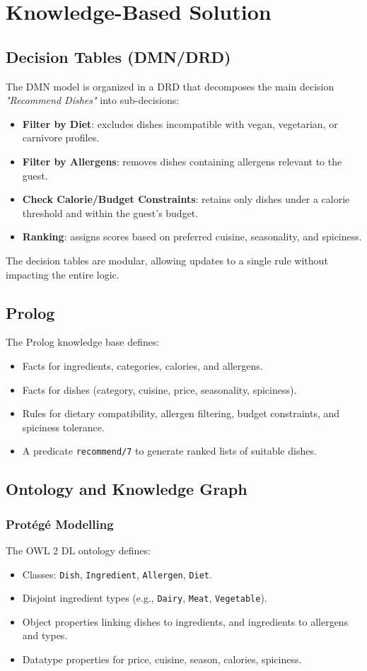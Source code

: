 \documentclass[a4paper,12pt]{article}
\begin{document}
\section{Knowledge-Based Solution}
\subsection{Decision Tables (DMN/DRD)}
The DMN model is organized in a DRD that decomposes the main decision \textit{"Recommend Dishes"} into sub-decisions:
\begin{itemize}
    \item \textbf{Filter by Diet}: excludes dishes incompatible with vegan, vegetarian, or carnivore profiles.
    \item \textbf{Filter by Allergens}: removes dishes containing allergens relevant to the guest.
    \item \textbf{Check Calorie/Budget Constraints}: retains only dishes under a calorie threshold and within the guest's budget.
    \item \textbf{Ranking}: assigns scores based on preferred cuisine, seasonality, and spiciness.
\end{itemize}
The decision tables are modular, allowing updates to a single rule without impacting the entire logic.

\subsection{Prolog}
The Prolog knowledge base defines:
\begin{itemize}
    \item Facts for ingredients, categories, calories, and allergens.
    \item Facts for dishes (category, cuisine, price, seasonality, spiciness).
    \item Rules for dietary compatibility, allergen filtering, budget constraints, and spiciness tolerance.
    \item A predicate \texttt{recommend/7} to generate ranked lists of suitable dishes.
\end{itemize}

\subsection{Ontology and Knowledge Graph}
\subsubsection{Protégé Modelling}
The OWL 2 DL ontology defines:
\begin{itemize}
    \item Classes: \texttt{Dish}, \texttt{Ingredient}, \texttt{Allergen}, \texttt{Diet}.
    \item Disjoint ingredient types (e.g., \texttt{Dairy}, \texttt{Meat}, \texttt{Vegetable}).
    \item Object properties linking dishes to ingredients, and ingredients to allergens and types.
    \item Datatype properties for price, cuisine, season, calories, spiciness.
\end{itemize}
\end{document}
